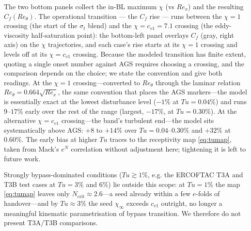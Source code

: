 \documentclass[journal]{new-aiaa}
\begin{document}
The two bottom panels collect the in-BL maximum
$\chi$ (vs $Re_x$) and the resulting $C_f(Re_\theta)$. The
operational transition --- the $C_f$ rise --- runs between the $\chi\!=\!1$
crossing (the start of the $\sigma_t$ blend) and the
$\chi\!=\!c_{v1}\!=\!7.1$ crossing (the eddy-viscosity half-saturation
point): the bottom-left panel overlays $C_f$ (gray, right axis) on the
$\chi$ trajectories, and each case's rise starts at its $\chi\!=\!1$
crossing and levels off at its $\chi\!=\!c_{v1}$ crossing. Because the
modeled transition has finite extent, quoting a single onset number
against AGS requires choosing a crossing, and the comparison depends on
the choice; we state the convention and give both readings. At the
$\chi\!=\!1$ crossing---converted to $Re_\theta$ through the
laminar relation $Re_\theta\!=\!0.664\sqrt{Re_x}$, the same convention that places
the AGS markers---the model is essentially exact at the lowest disturbance level
($-1\%$ at $Tu\!=\!0.04\%$) and runs $9$--$17\%$ early over the rest of the range
(largest, $-17\%$, at $Tu\!=\!0.30\%$). At the alternative $\chi\!=\!c_{v1}$
crossing---the band's turbulent end---the model sits systematically above AGS:
$+8$ to $+14\%$ over $Tu\!=\!0.04$--$0.30\%$ and $+32\%$ at $0.60\%$. The early
bias at higher $Tu$ traces to the receptivity map \eqref{eq:tumap}, taken from
Mack's $e^N$ correlation without adjustment here; tightening it is left to
future work.

Strongly bypass-dominated
conditions ($Tu\!\gtrsim\!1\%$, e.g. the ERCOFTAC T3A and T3B test cases at
$Tu\!=\!3\%$ and $6\%$) lie outside this scope: at
$Tu\!=\!1\%$ the map
\eqref{eq:tumap} leaves only $N_\mathrm{crit}\!\approx\!2.6$---a seed already
within a few $e$-folds of handover---and by $Tu\!\approx\!3\%$ the seed
$\chi_\infty$ exceeds $c_{v1}$ outright, no longer a meaningful kinematic
parametrisation of bypass transition. We therefore do not present T3A/T3B
comparisons.
\end{document}
